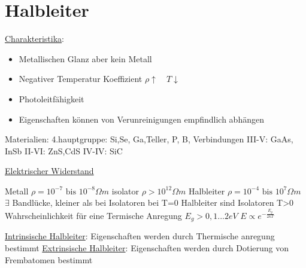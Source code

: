 \chapter{Halbleiter}

\underline{Charakteristika}:

\begin{itemize}
\item Metallischen Glanz aber kein Metall
\item Negativer Temperatur Koeffizient \(\rho\uparrow \quad T\downarrow\)
\item Photoleitfähigkeit
\item Eigenschaften können von Verunreinigungen empfindlich abhängen
\end{itemize}

 Materialien:
4.hauptgruppe: Si,Se, Ga,Teller, P, B,
Verbindungen III-V: GaAs, InSb
II-VI: ZnS,CdS
IV-IV: SiC


\underline{Elektrischer Widerstand}

Metall \(\rho = 10^{-7} \text{ bis } 10^{-8}\Omega m\)
isolator \(\rho > 10^{12}\Omega m \)
Halbleiter \(\rho = 10^{-4} \text{ bis } 10^{7}\Omega m \)
\(\exists\) Bandlücke, kleiner als bei Isolatoren
bei T=0 Halbleiter sind Isolatoren
T>0 Wahrscheinlichkeit für eine Termische Anregung
\(E_g>0,1 ... 2eV\)
\(E\propto e^{-\frac{E_g}{2kT}}\)

\underline{Intrinsische Halbleiter}: Eigenschaften werden durch Thermische anregung bestimmt
\underline{Extrinsische Halbleiter}: Eigenschaften werden durch Dotierung von Frembatomen bestimmt


